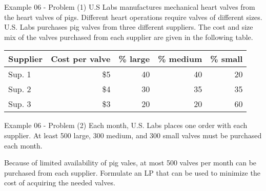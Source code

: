 \begin{frame}{Example 06 - Problem (1)}
U.S Labs manufactures mechanical heart valves from the heart valves of pigs.
Different heart operations require valves of different sizes. U.S. Labs
purchases pig valves from three different suppliers. The cost and size mix of
the valves purchased from each supplier are given in the following table.

\begin{center}
\begin{tabular}{lrrrr}
\hline
  \cellcolor{gray90}\textbf{Supplier}
& \cellcolor{gray90}\textbf{Cost per valve}
& \cellcolor{gray90}\textbf{\% large}
& \cellcolor{gray90}\textbf{\% medium}
& \cellcolor{gray90}\textbf{\% small} \\
\hline
Sup. 1 & \$5 & 40 & 40 & 20 \\
Sup. 2 & \$4 & 30 & 35 & 35 \\
Sup. 3 & \$3 & 20 & 20 & 60 \\
\hline
\end{tabular}
\end{center}

\end{frame}

\begin{frame}{Example 06 - Problem (2)}
Each month, U.S. Labs places one order with each supplier. At least 500 large,
300 medium, and 300 small valves must be purchased each month.

Because of limited availability of pig vales, at most 500 valves per month can
be purchased from each supplier. Formulate an LP that can be used to minimize
the cost of acquiring the needed valves.

\end{frame}
